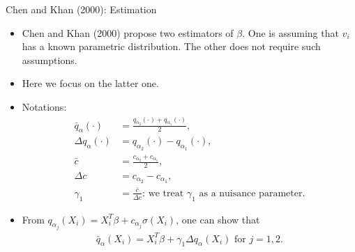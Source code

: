 \documentclass[xcolor=svgnames,dvipdfmx,cjk]{beamer}
\theoremstyle{example}
\begin{document}
\begin{frame}{Chen and Khan (2000): Estimation}
      \begin{itemize}
            \item Chen and Khan (2000) propose two estimators of $\beta$. 
                  One is assuming that $v_i$ has a known parametric distribution.
                  The other does not require such assumptions.
            \item Here we focus on the latter one.
            \item Notations:
                  \begin{align*}
                        \bar{q}_{\alpha}(\cdot) &= \frac{q_{\alpha_2}(\cdot) + q_{\alpha_1}(\cdot)}{2}, \\
                        \Delta q_{\alpha}(\cdot) &= q_{\alpha_2}(\cdot) - q_{\alpha_1}(\cdot), \\
                        \bar{c} &= \frac{c_{\alpha_2} + c_{\alpha_1}}{2}, \\
                        \Delta c &= c_{\alpha_2} - c_{\alpha_1}, \\
                        \gamma_1 &= \frac{\bar{c}}{\Delta c} \text{: we treat } \gamma_1 \text{ as a nuisance parameter.}
                  \end{align*}
            \item From $ q_{\alpha_j}(X_i) = X_i^T \beta + c_{\alpha_j} \sigma(X_i)$,
                  one can show that 
                  \begin{align*}
                        \bar{q}_{\alpha}(X_i) = X_i^T \beta + \gamma_1 \Delta q_{\alpha}(X_i) \text{ for } j=1,2.
                  \end{align*}
      \end{itemize}
\end{frame}
\end{document}
